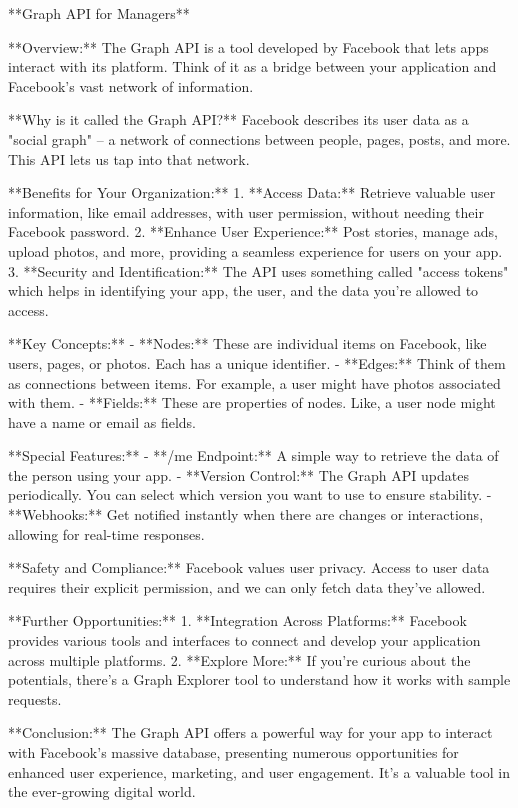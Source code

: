 **Graph API for Managers**

**Overview:**
The Graph API is a tool developed by Facebook that lets apps interact with its platform. Think of it as a bridge between your application and Facebook's vast network of information.

**Why is it called the Graph API?**
Facebook describes its user data as a "social graph" – a network of connections between people, pages, posts, and more. This API lets us tap into that network.

**Benefits for Your Organization:**
1. **Access Data:** Retrieve valuable user information, like email addresses, with user permission, without needing their Facebook password.
2. **Enhance User Experience:** Post stories, manage ads, upload photos, and more, providing a seamless experience for users on your app.
3. **Security and Identification:** The API uses something called "access tokens" which helps in identifying your app, the user, and the data you're allowed to access.

**Key Concepts:**
- **Nodes:** These are individual items on Facebook, like users, pages, or photos. Each has a unique identifier.
- **Edges:** Think of them as connections between items. For example, a user might have photos associated with them.
- **Fields:** These are properties of nodes. Like, a user node might have a name or email as fields.

**Special Features:**
- **/me Endpoint:** A simple way to retrieve the data of the person using your app.
- **Version Control:** The Graph API updates periodically. You can select which version you want to use to ensure stability.
- **Webhooks:** Get notified instantly when there are changes or interactions, allowing for real-time responses.

**Safety and Compliance:**
Facebook values user privacy. Access to user data requires their explicit permission, and we can only fetch data they've allowed.

**Further Opportunities:**
1. **Integration Across Platforms:** Facebook provides various tools and interfaces to connect and develop your application across multiple platforms.
2. **Explore More:** If you're curious about the potentials, there's a Graph Explorer tool to understand how it works with sample requests.

**Conclusion:**
The Graph API offers a powerful way for your app to interact with Facebook's massive database, presenting numerous opportunities for enhanced user experience, marketing, and user engagement. It's a valuable tool in the ever-growing digital world.